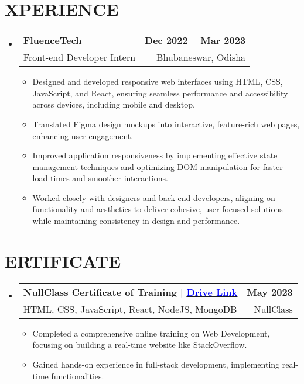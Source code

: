 \documentclass[letterpaper,11pt]{article}
\makeatletter
\newcommand{\resumeItem}[1]{
  \item\small{
    {#1 \vspace{-2pt}}
  }
}
\newcommand{\resumeSubheading}[4]{
  \vspace{-2pt}\item
    \begin{tabular*}{1.0\textwidth}[t]{l@{\extracolsep{\fill}}r}
      \textbf{#1} & \textbf{\small #2} \\
      #3 & #4 \\
    \end{tabular*}\vspace{-7pt}
}
\newcommand{\resumeSubHeadingListStart}{\begin{itemize}[leftmargin=0.0in, label={}]}
\newcommand{\resumeSubHeadingListEnd}{\end{itemize}}
\newcommand{\resumeItemListStart}{\begin{itemize}}
\newcommand{\resumeItemListEnd}{\end{itemize}\vspace{-5pt}}
\makeatother
\begin{document}
\section{\textrm{\scalebox{1.2}{E}XPERIENCE}}

  \resumeSubHeadingListStart

    \resumeSubheading
      {FluenceTech}{Dec 2022 -- Mar 2023}
      {Front-end Developer Intern}{Bhubaneswar, Odisha}
      \resumeItemListStart
        \resumeItem{Designed and developed responsive web interfaces using HTML, CSS, JavaScript, and React, ensuring seamless performance and accessibility across devices, including mobile and desktop.}
        \resumeItem{Translated Figma design mockups into interactive, feature-rich web pages, enhancing user engagement.}
        \resumeItem{Improved application responsiveness by implementing effective state management techniques and optimizing DOM manipulation for faster load times and smoother interactions.}
        \resumeItem{Worked closely with designers and back-end developers, aligning on functionality and aesthetics to deliver cohesive, user-focused solutions while maintaining consistency in design and performance.}
      \resumeItemListEnd
    \vspace{5pt}
  \resumeSubHeadingListEnd

\begin{}
  
\end{}

\section{\textrm{\scalebox{1.2}{C}ERTIFICATE}}

    \resumeSubHeadingListStart
    \resumeSubheading
        {NullClass Certificate of Training $|$ \href{https://drive.google.com/file/d/1GZ8qfVwk2DCE8oYuyjaqF5XNRdcQWHjE/view}{\raisebox{0.09\height}{\scalebox{0.8}{\faFileContract}} \underline{\textcolor{Blue}{\textnormal{Drive Link}}}}}
        {May 2023}
        {HTML, CSS, JavaScript, React, NodeJS, MongoDB}
        {NullClass}
        \resumeItemListStart
            \resumeItem{Completed a comprehensive online training on Web Development, focusing on building a real-time website like StackOverflow.}
            \resumeItem{Gained hands-on experience in full-stack development, implementing real-time functionalities.}
        \resumeItemListEnd
    \vspace{5pt}
\resumeSubHeadingListEnd
\end{document}
